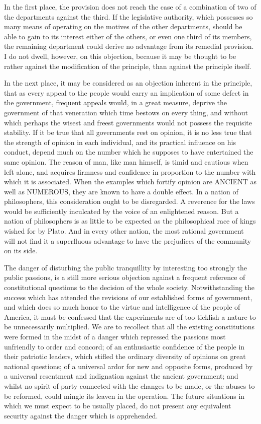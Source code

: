 In the first place, the provision does not reach the case of a combination of two of the departments against the third. If the legislative authority, which possesses so many means of operating on the motives of the other departments, should be able to gain to its interest either of the others, or even one third of its members, the remaining department could derive no advantage from its remedial provision. I do not dwell, however, on this objection, because it may be thought to be rather against the modification of the principle, than against the principle itself.

In the next place, it may be considered as an objection inherent in the principle, that as every appeal to the people would carry an implication of some defect in the government, frequent appeals would, in a great measure, deprive the government of that veneration which time bestows on every thing, and without which perhaps the wisest and freest governments would not possess the requisite stability. If it be true that all governments rest on opinion, it is no less true that the strength of opinion in each individual, and its practical influence on his conduct, depend much on the number which he supposes to have entertained the same opinion. The reason of man, like man himself, is timid and cautious when left alone, and acquires firmness and confidence in proportion to the number with which it is associated. When the examples which fortify opinion are ANCIENT as well as NUMEROUS, they are known to have a double effect. In a nation of philosophers, this consideration ought to be disregarded. A reverence for the laws would be sufficiently inculcated by the voice of an enlightened reason. But a nation of philosophers is as little to be expected as the philosophical race of kings wished for by Plato. And in every other nation, the most rational government will not find it a superfluous advantage to have the prejudices of the community on its side.

The danger of disturbing the public tranquillity by interesting too strongly the public passions, is a still more serious objection against a frequent reference of constitutional questions to the decision of the whole society. Notwithstanding the success which has attended the revisions of our established forms of government, and which does so much honor to the virtue and intelligence of the people of America, it must be confessed that the experiments are of too ticklish a nature to be unnecessarily multiplied. We are to recollect that all the existing constitutions were formed in the midst of a danger which repressed the passions most unfriendly to order and concord; of an enthusiastic confidence of the people in their patriotic leaders, which stifled the ordinary diversity of opinions on great national questions; of a universal ardor for new and opposite forms, produced by a universal resentment and indignation against the ancient government; and whilst no spirit of party connected with the changes to be made, or the abuses to be reformed, could mingle its leaven in the operation. The future situations in which we must expect to be usually placed, do not present any equivalent security against the danger which is apprehended.

